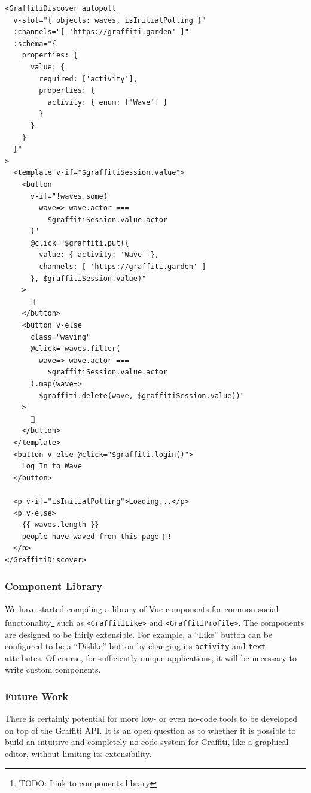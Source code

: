 \begin{verbatim}
<GraffitiDiscover autopoll
  v-slot="{ objects: waves, isInitialPolling }"
  :channels="[ 'https://graffiti.garden' ]"
  :schema="{
    properties: {
      value: {
        required: ['activity'],
        properties: {
          activity: { enum: ['Wave'] }
        }
      }
    }
  }"
>
  <template v-if="$graffitiSession.value">
    <button
      v-if="!waves.some(
        wave=> wave.actor ===
          $graffitiSession.value.actor
      )"
      @click="$graffiti.put({
        value: { activity: 'Wave' },
        channels: [ 'https://graffiti.garden' ]
      }, $graffitiSession.value)"
    >
      👋
    </button>
    <button v-else
      class="waving"
      @click="waves.filter(
        wave=> wave.actor ===
          $graffitiSession.value.actor
      ).map(wave=>
        $graffiti.delete(wave, $graffitiSession.value))"
    >
      👋
    </button>
  </template>
  <button v-else @click="$graffiti.login()">
    Log In to Wave
  </button>

  <p v-if="isInitialPolling">Loading...</p>
  <p v-else>
    {{ waves.length }}
    people have waved from this page 👋!
  </p>
</GraffitiDiscover>
\end{verbatim}

\subsubsection{Component Library}

We have started compiling a library of Vue components
for common social functionality\footnote{
    TODO: Link to components library
}
such as \texttt{<GraffitiLike>} and \texttt{<GraffitiProfile>}.
The components are designed to be fairly extensible.
For example, a ``Like'' button can be configured to be a
``Dislike'' button by changing its \texttt{activity} and
\texttt{text} attributes.
Of course, for sufficiently unique applications, it will be necessary to
write custom components.

\subsubsection{Future Work}
\label{above-and-below:above:future-work}

There is certainly potential for more low- or even no-code tools
to be developed on top of the Graffiti API. It is an open
question as to whether it is possible to build an intuitive and completely
no-code system for Graffiti, like a graphical editor, without limiting
its extensibility.

